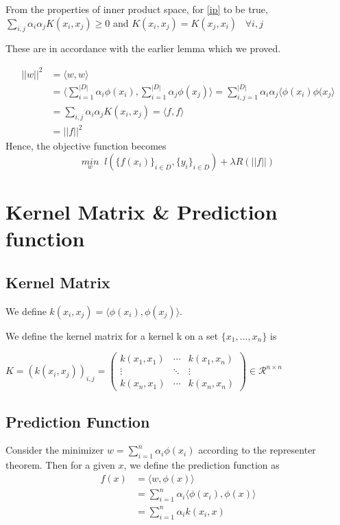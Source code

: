 \documentclass[12pt]{article}
\begin{document}
From the properties of inner product space, for \ref{ip} to be true,
$\sum_{i,j} \alpha_{i}\alpha_{j}K(x_{i},x_{j}) \ge 0$
and 
$ K(x_{i},x_{j}) = K(x_{j},x_{i}) \; \; \; \forall i,j$

These are in accordance with the earlier lemma which we proved.

\begin{align*}
    ||w||^{2} &= \langle w,w \rangle \\
    &= \langle\sum_{i=1}^{|D|}\alpha_{i} \phi(x_{i}),\sum_{i=1}^{|D|} \alpha_{j}\phi(x_{j})  \rangle  = \sum_{i,j = 1}^{|D|} \alpha_{i} \alpha_{j} \langle \phi(x_{i})\phi(x_{j} \rangle \\
    &= \sum_{i,j} \alpha_{i} \alpha_{j} K(x_{i},x_{j}) = \langle f,f \rangle \\
    & = ||f||^{2}
\end{align*}
Hence, the objective function becomes 
\[\underset{w}{min} \; \; l (\{f(x_{i})\}_{i \in D}, \{y_{i}\}_{i \in D} ) + \lambda R(||f||) \]







\section{Kernel Matrix \& Prediction function}
\subsection{Kernel Matrix}
We define $k(x_i,x_j) = \langle\phi(x_i),\phi(x_j)\rangle$.
\begin{definition}
    We define the kernel matrix for a kernel k on a set $\{x_1,...,x_n\}$ is
    \begin{center}
        $K = (k(x_i,x_j))_{i,j} = \begin{pmatrix}
            k(x_1,x_1) & \cdots & k(x_1,x_n)\\
            \vdots & \ddots & \vdots\\
            k(x_n,x_1) & \cdots & k(x_n,x_n)
        \end{pmatrix}\in\mathcal{R}^{n\times n}$
    \end{center}
\end{definition}
\subsection{Prediction Function}
Consider the minimizer $w = \sum_{i=1}^n\alpha_i\phi(x_i)$ according to the representer theorem. Then for a given $x$, we define the prediction function as
\begin{align*}
    f(x) &= \langle w,\phi(x)\rangle\\
         &= \sum_{i=1}^{n} \alpha_i \langle \phi(x_i),\phi(x)\rangle \\
         &= \sum_{i=1}^n \alpha_ik(x_i,x)
\end{align*}
\end{document}
